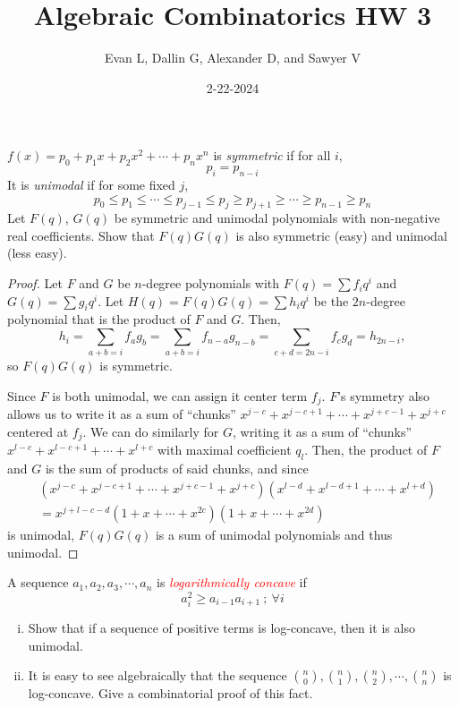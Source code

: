 \documentclass[11pt]{scrartcl}
\title{Algebraic Combinatorics HW 3}
\author{Evan L, Dallin G, Alexander D, and Sawyer V}
\date{2-22-2024}
\begin{document}
\maketitle
\setcounter{section}{1}
\begin{problem}
    $f(x)= p_0 + p_1x + p_2x^2 + \cdots + p_nx^n$ is \textit{symmetric} if for all $i$, $$p_i=p_{n-i}$$ It is \textit{unimodal} if for some fixed $j$, $$p_0\le p_1\le \cdots \le p_{j-1}\le p_j \ge p_{j+1}\ge \cdots \ge p_{n-1}\ge p_n$$ Let $F(q)$, $G(q)$ be symmetric and unimodal polynomials with non-negative real coefficients. Show that $F(q)G(q)$ is also symmetric (easy) and unimodal (less easy).
\end{problem}
\begin{proof}
Let $F$ and $G$ be $n$-degree polynomials with $F(q)=\sum f_iq^i$ and $G(q)=\sum g_iq^i$. Let $H(q)=F(q)G(q)=\sum h_i q^i$ be the $2n$-degree polynomial that is the product of $F$ and $G$. Then, \[h_i=\sum_{a+b=i}f_ag_b=\sum_{a+b=i}f_{n-a}g_{n-b}=\sum_{c+d=2n-i}f_cg_d=h_{2n-i},\] so $F(q)G(q)$ is symmetric.

Since $F$ is both unimodal, we can assign it center term $f_j$. $F$'s symmetry also allows us to write it as a sum of ``chunks'' $x^{j-c}+x^{j-c+1}+\cdots+x^{j+c-1}+x^{j+c}$  centered at $f_j$. We can do similarly for $G$, writing it as a sum of ``chunks'' $x^{l-c}+x^{l-c+1}+\cdots+x^{l+c}$ with maximal coefficient $q_l$. Then, the product of $F$ and $G$ is the sum of products of said chunks, and since 
\begin{align*}
    &(x^{j-c}+x^{j-c+1}+\cdots+x^{j+c-1}+x^{j+c})(x^{l-d}+x^{l-d+1}+\cdots+x^{l+d})\\
    &=x^{j+l-c-d}(1+x+\cdots+x^{2c})(1+x+\cdots+x^{2d})
\end{align*}
is unimodal, $F(q)G(q)$ is a sum of unimodal polynomials and thus unimodal.
\end{proof}
\begin{problem}[\textcolor{red}{Log-concavity of Binomial coefficients}]
    A sequence $a_1,a_2, a_3, \cdots, a_n$ is \textcolor{red}{\textit{logarithmically concave}} if $$a_i^2\ge a_{i-1}a_{i+1}~;~ \forall i$$

    \begin{enumerate}[(i)]
        \item Show that if a sequence of positive terms is log-concave, then it is also unimodal.\smallskip
        \item It is easy to see algebraically that the sequence $\binom{n}{0},\binom{n}{1}, \binom{n}{2}, \cdots, \binom{n}{n}$ is log-concave. Give a combinatorial proof of this fact.
    \end{enumerate}
\end{problem}
\end{document}
